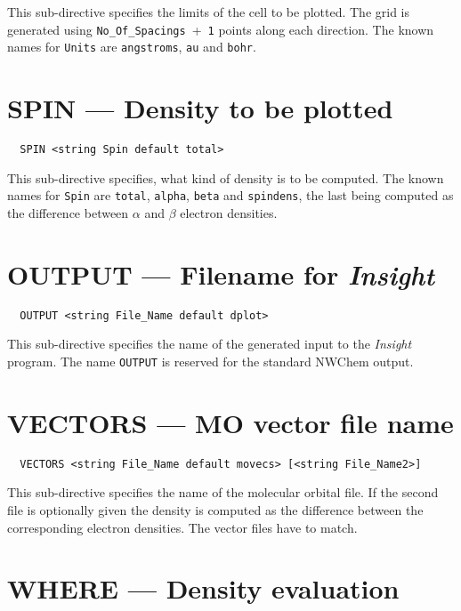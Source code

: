 This sub-directive specifies the limits of the cell to be plotted.
The grid is generated using \verb+No_Of_Spacings+~+~\verb+1+ points
along each direction. The known names for \verb+Units+ are
\verb+angstroms+, \verb+au+ and \verb+bohr+.



\section{SPIN --- Density to be plotted}

\begin{verbatim}
  SPIN <string Spin default total>
\end{verbatim}

This sub-directive specifies, what kind of density is to be computed. The 
known names for \verb+Spin+ are \verb+total+, \verb+alpha+, \verb+beta+
and \verb+spindens+, the last being computed as the difference between
$\alpha$ and $\beta$ electron densities.



\section{OUTPUT --- Filename for {\em Insight}}

\begin{verbatim}
  OUTPUT <string File_Name default dplot>
\end{verbatim}

This sub-directive specifies the name of the generated input to the
{\em Insight} program. The name \verb+OUTPUT+ is reserved for the
standard NWChem output.



\section{VECTORS --- MO vector file name}

\begin{verbatim}
  VECTORS <string File_Name default movecs> [<string File_Name2>]
\end{verbatim}

This sub-directive specifies the name of the molecular orbital file.
If the second file is optionally given the density is computed as the
difference between the corresponding electron densities. The vector 
files have to match.



\section{WHERE --- Density evaluation}

